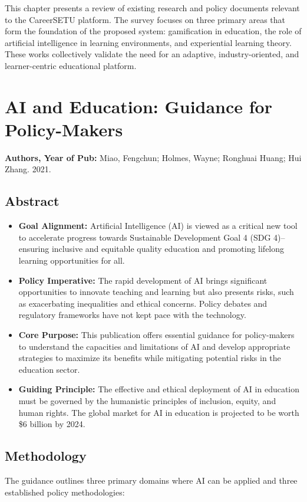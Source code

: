 \documentclass[12pt,a4paper]{report}
\begin{document}
This chapter presents a review of existing research and policy documents relevant to the
CareerSETU platform. The survey focuses on three primary areas that form the foundation
of the proposed system: gamification in education, the role of artificial intelligence in
learning environments, and experiential learning theory. These works collectively validate
the need for an adaptive, industry-oriented, and learner-centric educational platform.

\section{AI and Education: Guidance for Policy-Makers}
\textbf{Authors, Year of Pub:} Miao, Fengchun; Holmes, Wayne; Ronghuai Huang; Hui Zhang. 2021.

\subsection{Abstract}
\begin{itemize}
  \item \textbf{Goal Alignment:} Artificial Intelligence (AI) is viewed as a critical new tool to accelerate progress towards Sustainable Development Goal 4 (SDG 4)--ensuring inclusive and equitable quality education and promoting lifelong learning opportunities for all.
  \item \textbf{Policy Imperative:} The rapid development of AI brings significant opportunities to innovate teaching and learning but also presents risks, such as exacerbating inequalities and ethical concerns. Policy debates and regulatory frameworks have not kept pace with the technology.
  \item \textbf{Core Purpose:} This publication offers essential guidance for policy-makers to understand the capacities and limitations of AI and develop appropriate strategies to maximize its benefits while mitigating potential risks in the education sector.
  \item \textbf{Guiding Principle:} The effective and ethical deployment of AI in education must be governed by the humanistic principles of inclusion, equity, and human rights. The global market for AI in education is projected to be worth \$6 billion by 2024.
\end{itemize}

\subsection{Methodology}
The guidance outlines three primary domains where AI can be applied and three established policy methodologies:
\end{document}
